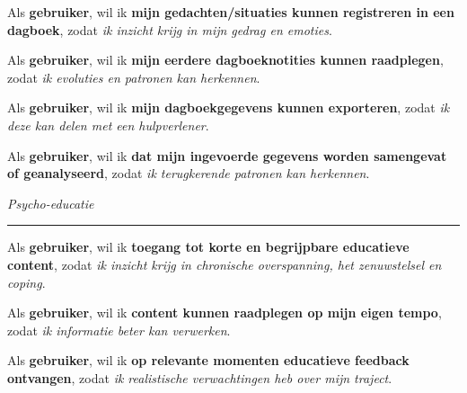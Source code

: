 Als \textbf{gebruiker}, \newline
wil ik \textbf{mijn gedachten/situaties kunnen registreren in een dagboek}, \newline
zodat \textit{ik inzicht krijg in mijn gedrag en emoties}.

\vspace{1em}

Als \textbf{gebruiker}, \newline
wil ik \textbf{mijn eerdere dagboeknotities kunnen raadplegen}, \newline
zodat \textit{ik evoluties en patronen kan herkennen}.

\vspace{1em}

Als \textbf{gebruiker}, \newline
wil ik \textbf{mijn dagboekgegevens kunnen exporteren}, \newline
zodat \textit{ik deze kan delen met een hulpverlener}.

\vspace{1em}

Als \textbf{gebruiker}, \newline
wil ik \textbf{dat mijn ingevoerde gegevens worden samengevat of geanalyseerd}, \newline
zodat \textit{ik terugkerende patronen kan herkennen}.

\vspace{1em}
\vspace{1em}

\textit{Psycho-educatie}
\hrule
\vspace{1em}

Als \textbf{gebruiker}, \newline
wil ik \textbf{toegang tot korte en begrijpbare educatieve content}, \newline
zodat \textit{ik inzicht krijg in chronische overspanning, het zenuwstelsel en coping}.

\vspace{1em}

Als \textbf{gebruiker}, \newline
wil ik \textbf{content kunnen raadplegen op mijn eigen tempo}, \newline
zodat \textit{ik informatie beter kan verwerken}.

\vspace{1em}

Als \textbf{gebruiker}, \newline
wil ik \textbf{op relevante momenten educatieve feedback ontvangen}, \newline
zodat \textit{ik realistische verwachtingen heb over mijn traject}.

